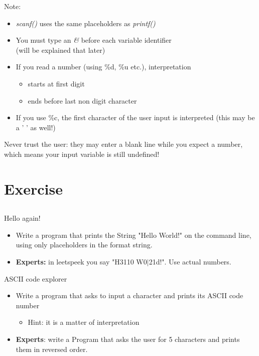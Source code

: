 \begin{frame}{Note:}
	\begin{itemize}
		\item \textit{scanf()} uses the same placeholders as \textit{printf()}
		\item You must type an \textit{\&} before each variable identifier \\
			(will be explained that later)
		\item If you read a number (using \%d, \%u etc.), interpretation
		\begin{itemize}
			\item starts at first digit
			\item ends before last non digit character
		\end{itemize}
		\item If you use \%c, the first character of the user input is interpreted (this may be a ' ' as well!)
	\end{itemize}
	Never trust the user: they may enter a blank line while you expect a number, which means your input variable is still undefined!
		
\end{frame}
\section{Exercise}
\subsection{}

\begin{frame}[fragile]{Hello again!}
	\begin{itemize}
	
		\item Write a program that prints the String "Hello World!" on the command line, using only placeholders in the format string.
		\item \textbf{Experts:} in leetspeek you say "H3110 W0$|$21d!". Use actual numbers.

	\end{itemize}
\end{frame}
\begin{frame}[fragile]{ASCII code explorer}
	\begin{itemize}
		\item Write a program that asks to input a character and prints its ASCII code number
		\begin{itemize}
			\item<2-> Hint: it is a matter of interpretation
		\end{itemize}
		\item \textbf{Experts}: write a Program that asks the user for 5 characters and prints them in reversed order.

	\end{itemize}	
\end{frame}

